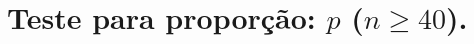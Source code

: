 \documentclass[8pt]{beamer}
\begin{document}
%
%
%
%
%
%	
%	
%	
%	
%
%

\section{Teste para proporção: $p$ ($n \geq 40$).}
\end{document}
